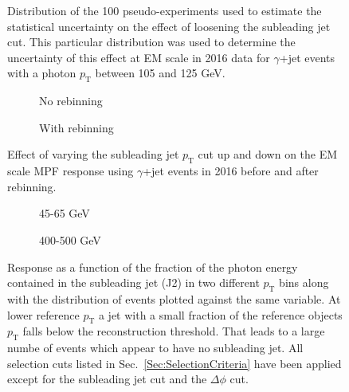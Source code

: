 \begin{figure}[!ht]
\begin{center}
\end{center}
\caption[Example pseudo-experiment distribution]
{\small Distribution of the 100 pseudo-experiments used to estimate the statistical uncertainty on the effect of loosening the subleading jet cut.  This particular distribution was used to determine the uncertainty of this effect at EM scale in 2016 data for $\gamma$+jet events with a photon $p_{\mathrm T}$ between 105 and 125 GeV.  }
\label{ExamplePseudo}
\end{figure}

\begin{figure}[!ht]
\centering
\begin{subfigure}{.5\textwidth}
\centering
{}
\caption{No rebinning}
\end{subfigure}%
\begin{subfigure}{.5\textwidth}
\centering
{}
\caption{With rebinning}
\end{subfigure}
\caption{Effect of varying the subleading jet $p_{\mathrm T}$ cut up and down on the EM scale MPF response using $\gamma$+jet events in 2016 before and after rebinning. }
\label{Fig:J2GJetEM2016}
\end{figure}

\begin{figure}[!ht]
\centering
\begin{subfigure}{.5\textwidth}
\centering
{}
\caption{45-65 GeV}
\end{subfigure}%
\begin{subfigure}{.5\textwidth}
\centering
{}
\caption{400-500 GeV}
\end{subfigure}
\caption{Response as a function of the fraction of the photon energy contained in the subleading jet (J2) in two different $p_{\mathrm T}$ bins along with the distribution of events plotted against the same variable.  At lower reference $p_{\mathrm T}$ a jet with a small fraction of the reference objects $p_{\mathrm T}$ falls below the reconstruction threshold.  That leads to a large numbe of events which appear to have no subleading jet.  All selection cuts listed in Sec.~\ref{Sec:SelectionCriteria} have been applied except for the subleading jet cut and the $\Delta\phi$ cut.  }
\label{Fig:RespVsJ2GJetEM2016}
\end{figure}


